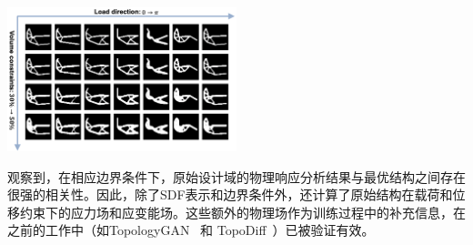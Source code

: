 \begin{table}[htbp]
    \centering
    \parbox{0.45\textwidth}{
        \caption{用于生成数据集的参数设置}
        \label{tab:settings}
        \centering
        }
    \vspace*{\baselineskip}
    \parbox{0.5\textwidth}{\centering \includegraphics[width=0.5\textwidth]{./figures/TONIR/op_structures_set.png}}
\end{table}

观察到，在相应边界条件下，原始设计域的物理响应分析结果与最优结构之间存在很强的相关性。因此，除了SDF表示和边界条件外，还计算了原始结构在载荷和位移约束下的应力场和应变能场。这些额外的物理场作为训练过程中的补充信息，在之前的工作中（如TopologyGAN~\cite{topologygan2021} 和 TopoDiff~\cite{maze2022}）已被验证有效。

